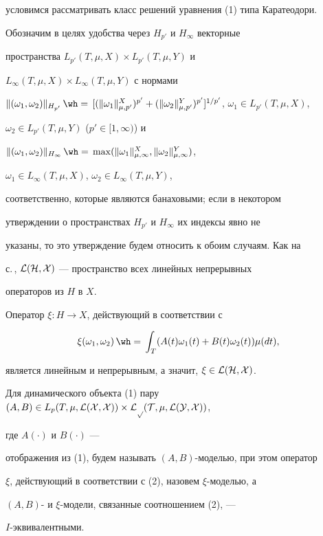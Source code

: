 условимся рассматривать класс решений уравнения (1) типа Каратеодори. 


 


Обозначим в целях удобства через $H_{p'}$ и $H_\infty$ векторные 


пространства $L_{p'}(T,\mu,X)\times L_{p'}(T,\mu,Y)$ и 


$L_\infty(T,\mu,X)\times L_\infty(T,\mu,Y)$ с нормами 


$\|(\omega_1,\omega_2)\|_{H_{p'}}\hateq 


[(\|\omega_1\|^X_{\mu,p'})^{p'}+ 


(\|\omega_2\|^Y_{\mu,p'})^{p'}]^{1/p'}$, $\omega_1\in L_{p'}(T,\mu,X)$, 


$\omega_2\in L_{p'}(T,\mu,Y)$ ($p'\in[1,\infty)$) и 


$\|(\omega_1,\omega_2)\|_{H_\infty}\hateq 


\max(\|\omega_1\|^X_{\mu,\infty}, \|\omega_2\|^Y_{\mu,\infty})$, 


$\omega_1\in L_\infty(T,\mu,X)$, $\omega_2\in L_\infty(T,\mu,Y)$, 


соответственно, которые являются банаховыми; если в некотором 


утверждении о пространствах $H_{p'}$ и $H_\infty$ их индексы явно не 


указаны, то это утверждение будем относить к обоим случаям. Как на


с.\,\pageref{space}, $\cal L(H,X)$ --- пространство всех линейных непрерывных 


операторов из $H$ в $X$. 


 


Оператор $\xi:H\to X$, действующий в соответствии с 


\begin{equation} 


\xi(\omega_1,\omega_2)\hateq\int_T(A(t)\omega_1(t)+B(t) 


\omega_2(t))\mu(dt), 


\end{equation} 


является линейным и непрерывным, а значит, $\xi\in \cal L(H,X)$. 


 


\begin{defn} 


Для динамического объекта (1) пару $(A,B)\in L_p(T,\mu,\cal 


L(X,X))\times\linebreak L_p(T,\mu,\cal L(Y,X))$,


где $A(\cdot)$ и $B(\cdot)$ --- 


отображения из (1), будем называть $(A,B)$-моделью, при этом оператор 


$\xi$, действующий в соответствии с (2), назовем $\xi$-моделью, а 


$(A,B)$- и $\xi$-модели, связанные соотношением (2), --- 


$I$-эквивалентными. 


\end{defn} 


